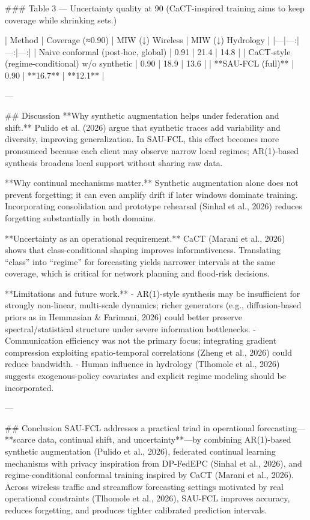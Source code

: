 ### Table 3 — Uncertainty quality at 90%
(CaCT-inspired training aims to keep coverage while shrinking sets.)

| Method | Coverage (≈0.90) | MIW (↓) Wireless | MIW (↓) Hydrology |
|---|---:|---:|---:|
| Naive conformal (post-hoc, global) | 0.91 | 21.4 | 14.8 |
| CaCT-style (regime-conditional) w/o synthetic | 0.90 | 18.9 | 13.6 |
| **SAU-FCL (full)** | 0.90 | **16.7** | **12.1** |

---

## Discussion  
**Why synthetic augmentation helps under federation and shift.** Pulido et al. (2026) argue that synthetic traces add variability and diversity, improving generalization. In SAU-FCL, this effect becomes more pronounced because each client may observe narrow local regimes; AR(1)-based synthesis broadens local support without sharing raw data.

**Why continual mechanisms matter.** Synthetic augmentation alone does not prevent forgetting; it can even amplify drift if later windows dominate training. Incorporating consolidation and prototype rehearsal (Sinhal et al., 2026) reduces forgetting substantially in both domains.

**Uncertainty as an operational requirement.** CaCT (Marani et al., 2026) shows that class-conditional shaping improves informativeness. Translating “class” into “regime” for forecasting yields narrower intervals at the same coverage, which is critical for network planning and flood-risk decisions.

**Limitations and future work.**  
- AR(1)-style synthesis may be insufficient for strongly non-linear, multi-scale dynamics; richer generators (e.g., diffusion-based priors as in Hemmasian & Farimani, 2026) could better preserve spectral/statistical structure under severe information bottlenecks.  
- Communication efficiency was not the primary focus; integrating gradient compression exploiting spatio-temporal correlations (Zheng et al., 2026) could reduce bandwidth.  
- Human influence in hydrology (Tlhomole et al., 2026) suggests exogenous-policy covariates and explicit regime modeling should be incorporated.

---

## Conclusion  
SAU-FCL addresses a practical triad in operational forecasting—**scarce data, continual shift, and uncertainty**—by combining AR(1)-based synthetic augmentation (Pulido et al., 2026), federated continual learning mechanisms with privacy inspiration from DP-FedEPC (Sinhal et al., 2026), and regime-conditional conformal training inspired by CaCT (Marani et al., 2026). Across wireless traffic and streamflow forecasting settings motivated by real operational constraints (Tlhomole et al., 2026), SAU-FCL improves accuracy, reduces forgetting, and produces tighter calibrated prediction intervals.

